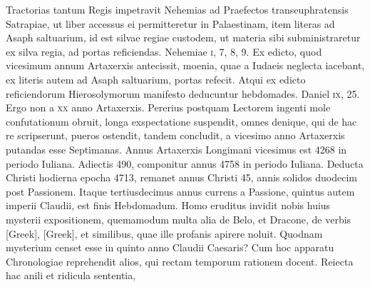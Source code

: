 \begin{parnumbers}
{}
\lnr{}Tractorias tantum Regis impetravit Nehemias ad Praefectos
transeuphratensis Satrapiae, ut liber accessus ei permitteretur
in Palaestinam, item literas ad Asaph saltuarium, id est silvae regiae
custodem, ut materia sibi subministraretur ex silva regia, ad
portas reficiendas.
\lnr{}Nehemiae \textsc{i}, 7, 8, 9.
\lnr{}Ex edicto, quod vicesimum
annum Artaxerxis antecissit, moenia, quae a Iudaeis neglecta
iacebant, ex literis autem ad Asaph saltuarium, portas refecit.
\lnr{}Atqui ex edicto reficiendorum Hierosolymorum manifesto deducuntur
hebdomades.
\lnr{}Daniel \textsc{ix}, 25.
\lnr{}Ergo non a \textsc{xx} anno Artaxerxis.
\lnr{}Pererius postquam Lectorem ingenti mole confutationum
obruit, longa exspectatione suspendit, omnes denique, qui
de hac re scripserunt, pueros ostendit, tandem concludit, a vicesimo
anno Artaxerxis putandas esse Septimanas.
\lnr{}Annus Artaxerxis
Longimani vicesimus est 4268 in periodo Iuliana.
\lnr{}Adiectis 490,
componitur annus 4758 in periodo Iuliana.
\lnr{}Deducta Christi hodierna
epocha 4713, remanet annus Christi 45, annis solidos duodecim
post Passionem.
\lnr{}Itaque tertiusdecimus annus currens a Passione,
quintus autem imperii Claudii, est finis Hebdomadum.
\lnr{}Homo eruditus invidit nobis huius mysterii expositionem, quemamodum
multa alia de Belo, et Dracone, de verbis \textgreek{[Greek]},
\textgreek{[Greek]}, et similibus, quae ille profanis apirere noluit.
\lnr{}Quodnam mysterium censet esse in quinto anno Claudii Caesaris?
\lnr{}Cum hoc apparatu Chronologiae reprehendit alios, qui rectam
temporum rationem docent.
\lnr{}Reiecta hac anili et ridicula sententia,

\end{parnumbers}
